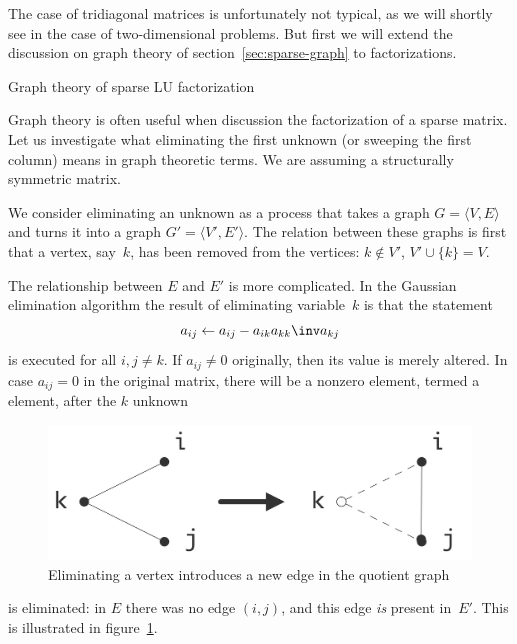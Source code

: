 The case of tridiagonal matrices is unfortunately not typical, as we
will shortly see in the case of two-dimensional problems. But first we
will extend the discussion on graph theory of
section~\ref{sec:sparse-graph} to factorizations.

 {Graph theory of sparse LU factorization}
\label{sec:lu-graph}

Graph theory is often useful when discussion the factorization of a
sparse matrix. Let us investigate what eliminating the first unknown
(or sweeping the first column) means in graph theoretic terms. We are
assuming a structurally symmetric matrix.

We consider eliminating an unknown as a process
that takes a graph $G=\langle V,E\rangle$ and
turns it into a graph $G'=\langle V',E'\rangle$. The relation between
these graphs is first that a vertex, say~$k$,
has been removed from the vertices:
$k\not\in V'$, $V'\cup \{k\}=V$.

The relationship between $E$ and $E'$ is more complicated. In the
Gaussian elimination algorithm the result of eliminating variable~$k$ is
that the statement
\[ a_{ij} \leftarrow a_{ij}- a_{ik}a_{kk}\inv a_{kj} \]
is executed for all $i,j\not=k$. If $a_{ij}\not=0$ originally, then
its value is merely altered. In case $a_{ij}=0$ in the original
matrix, there will be a nonzero element, termed a 
element, after the $k$ unknown
\begin{figure}[ht]
  \includegraphics[scale=.12]{graphics/ijk-eliminate}
  \caption{Eliminating a vertex introduces a new edge in the quotient
    graph}
  \label{fig:ijk-eliminate}
\end{figure}
is eliminated: in $E$ there was no edge $(i,j)$, and
this edge \emph{is} present in~$E'$. This is illustrated in
figure~\ref{fig:ijk-eliminate}.

